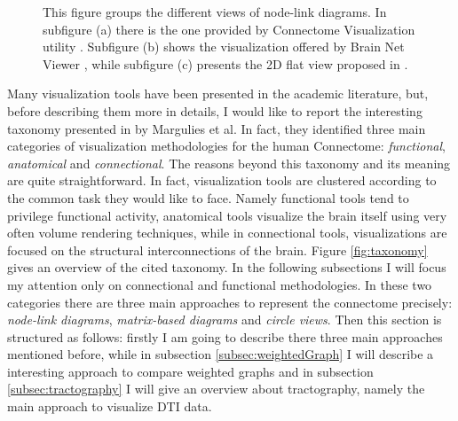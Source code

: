 \documentclass{article}
\begin{document}
\begin{multicols}{2}
\begin{figure}[ht]
{		}

	\caption{This figure groups the different views of node-link diagrams. In subfigure (a) there is the one provided by Connectome Visualization utility \cite{connectomeVisualizationUtility}. Subfigure (b) shows the visualization offered by Brain Net Viewer \cite{brainNetViewer}, while subfigure (c) presents the 2D flat view proposed in \cite{salvador2005undirected}.}
\end{figure}


Many visualization tools have been presented in the academic literature, but, before describing them more in details, I would like to report the interesting taxonomy presented in \cite{visualizingHumanConnectome} by Margulies et al. In fact, they identified three main categories of visualization methodologies for the human Connectome: \textit{functional}, \textit{anatomical} and \textit{connectional}. The reasons beyond this taxonomy and its meaning are quite straightforward. In fact, visualization tools are clustered according to the common task they would like to face. Namely functional tools tend to privilege functional activity, anatomical tools visualize the brain itself using very often volume rendering techniques, while in connectional tools, visualizations are focused on the structural interconnections of the brain. Figure \ref{fig:taxonomy} gives an overview of the cited taxonomy. In the following subsections I will focus my attention only on connectional and functional methodologies. In these two categories there are three main approaches to represent the connectome precisely: \textit{node-link diagrams}, \textit{matrix-based diagrams} and \textit{circle views}. Then this section is structured as follows: firstly I am going to describe there three main approaches mentioned before, while in subsection \ref{subsec:weightedGraph} I will describe a interesting approach to compare weighted graphs and in subsection \ref{subsec:tractography} I will give an overview about tractography, namely the main approach to visualize DTI data.



\end{multicols}
\end{document}
